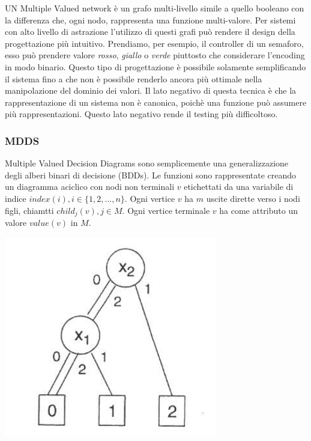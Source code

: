 \documentclass[italian,]{book}
\begin{document}
UN Multiple Valued network è un grafo multi-livello simile a quello booleano con la differenza che, ogni nodo, rappresenta una funzione multi-valore. Per sistemi con alto livello di astrazione l'utilizzo di questi grafi può rendere il design della progettazione più intuitivo. Prendiamo, per esempio, il controller di un semaforo, esso può prendere valore \emph{rosso}, \emph{giallo} o \emph{verde} piuttosto che considerare l'encoding in modo binario. Questo tipo di progettazione è possibile solamente semplificando il sistema fino a che non è possibile renderlo ancora più ottimale nella manipolazione del dominio dei valori. Il lato negativo di questa tecnica è che la rappresentazione di un sistema non è canonica, poichè una funzione può assumere più rappresentazioni. Questo lato negativo rende il testing più difficoltoso.

\newpage

\hypertarget{mdds}{%
\subsubsection{MDDS}\label{mdds}}

Multiple Valued Decision Diagrams sono semplicemente una generalizzazione degli alberi binari di decisione (BDDs). Le funzioni sono rappresentate creando un diagramma aciclico con nodi non terminali \(v\) etichettati da una variabile di indice \(index(i), i \in \{1,2,...,n\}\). Ogni vertice \(v\) ha \(m\) uscite dirette verso i nodi figli, chiamtti \(child_j(v), j \in M\). Ogni vertice terminale \(v\) ha come attributo un valore \(value(v)\) in \(M\).

\includegraphics[width=0.7\textwidth,height=\textheight]{./media/04.png}
\end{document}
